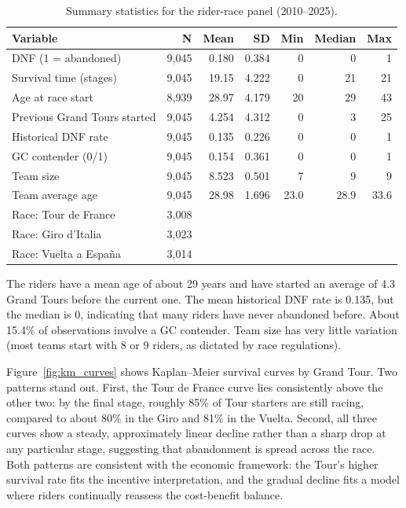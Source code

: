 \begin{table}[htbp]
\centering
\caption{Summary statistics for the rider-race panel (2010--2025).}
\label{tab:summary}
\small
\begin{tabular}{lrrrrrr}
\toprule
Variable & N & Mean & SD & Min & Median & Max \\
\midrule
DNF (1 = abandoned)          & 9{,}045 & 0.180 & 0.384 & 0 & 0 & 1 \\
Survival time (stages)       & 9{,}045 & 19.15 & 4.222 & 0 & 21 & 21 \\
Age at race start            & 8{,}939 & 28.97 & 4.179 & 20 & 29 & 43 \\
Previous Grand Tours started & 9{,}045 & 4.254 & 4.312 & 0 & 3 & 25 \\
Historical DNF rate          & 9{,}045 & 0.135 & 0.226 & 0 & 0 & 1 \\
GC contender (0/1)           & 9{,}045 & 0.154 & 0.361 & 0 & 0 & 1 \\
Team size                    & 9{,}045 & 8.523 & 0.501 & 7 & 9 & 9 \\
Team average age             & 9{,}045 & 28.98 & 1.696 & 23.0 & 28.9 & 33.6 \\
\midrule
Race: Tour de France         & 3{,}008 & & & & & \\
Race: Giro d'Italia          & 3{,}023 & & & & & \\
Race: Vuelta a Espa\~{n}a    & 3{,}014 & & & & & \\
\bottomrule
\end{tabular}
\end{table}

The riders have a mean age of about 29 years and have started an average of 4.3 Grand Tours before the current one. The mean historical DNF rate is 0.135, but the median is 0, indicating that many riders have never abandoned before. About 15.4\% of observations involve a GC contender. Team size has very little variation (most teams start with 8 or 9 riders, as dictated by race regulations).

Figure~\ref{fig:km_curves} shows Kaplan--Meier survival curves by Grand Tour. Two patterns stand out. First, the Tour de France curve lies consistently above the other two: by the final stage, roughly 85\% of Tour starters are still racing, compared to about 80\% in the Giro and 81\% in the Vuelta. Second, all three curves show a steady, approximately linear decline rather than a sharp drop at any particular stage, suggesting that abandonment is spread across the race. Both patterns are consistent with the economic framework: the Tour's higher survival rate fits the incentive interpretation, and the gradual decline fits a model where riders continually reassess the cost-benefit balance.

